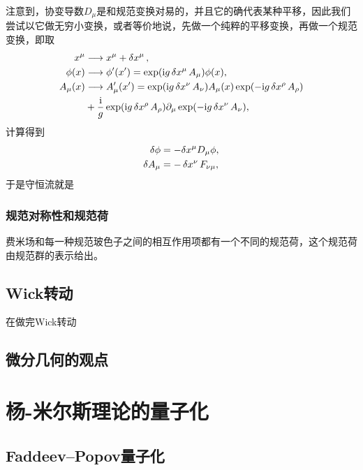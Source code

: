 注意到，协变导数$D_\mu$是和规范变换对易的，并且它的确代表某种平移，因此我们尝试以它做无穷小变换，或者等价地说，先做一个纯粹的平移变换，再做一个规范变换，即取
\begin{equation}
    \begin{aligned}
        x^\mu &\longrightarrow x^\mu + \var{x^\mu}, \\
        \phi(x) &\longrightarrow \phi'(x') = \exp(\mathrm{i} g \var{x^\mu} A_\mu) \phi(x), \\
        A_\mu(x) &\longrightarrow A_{\mu}'(x') = \exp(\mathrm{i} g \var{x^\nu} A_\nu) A_\mu(x) \exp(- \mathrm{i} g \var{x^\rho} A_\rho) \\
        &+ \frac{\mathrm{i}}{g} \exp(\mathrm{i} g \var{x^\rho} A_\rho) \partial_\mu \exp(- \mathrm{i} g \var{x^\nu} A_\nu),
    \end{aligned}
\end{equation}
计算得到
\begin{equation}
    \begin{aligned}
        \var{\phi} &= - \var x^\mu D_\mu \phi, \\
        \var{A_\mu} &= - \var{x^\nu} F_{\nu \mu},
    \end{aligned} 
\end{equation}
于是守恒流就是

\subsubsection{规范对称性和规范荷}

费米场和每一种规范玻色子之间的相互作用项都有一个不同的规范荷，这个规范荷由规范群的表示给出。

\subsection{Wick转动}

在做完Wick转动

\subsection{微分几何的观点}

\section{杨-米尔斯理论的量子化}

\subsection{Faddeev–Popov量子化}

